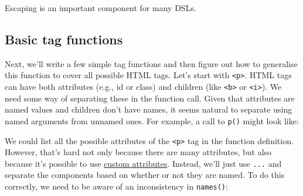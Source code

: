 Escaping is an important component for many DSLs.

\subsection{Basic tag functions}

Next, we'll write a few simple tag functions and then figure out how to
generalise this function to cover all possible HTML tags. Let's start
with \texttt{\textless{}p\textgreater{}}. HTML tags can have both
attributes (e.g., id or class) and children (like
\texttt{\textless{}b\textgreater{}} or
\texttt{\textless{}i\textgreater{}}). We need some way of separating
these in the function call. Given that attributes are named values and
children don't have names, it seems natural to separate using named
arguments from unnamed ones. For example, a call to \texttt{p()} might
look like:

\begin{Shaded}
\begin{Highlighting}[]
\NormalTok{(}\NormalTok{, }\NormalTok{(}\NormalTok{), } \NormalTok{)}
\end{Highlighting}
\end{Shaded}

We could list all the possible attributes of the
\texttt{\textless{}p\textgreater{}} tag in the function definition.
However, that's hard not only because there are many attributes, but
also because it's possible to use
\href{http://html5doctor.com/html5-custom-data-attributes/}{custom
attributes}. Instead, we'll just use \texttt{...} and separate the
components based on whether or not they are named. To do this correctly,
we need to be aware of an inconsistency in \texttt{names()}:

\begin{Shaded}
\begin{Highlighting}[]
\NormalTok{(}\NormalTok{(} \NormalTok{, } \NormalTok{))}
\NormalTok{(}\NormalTok{(} \NormalTok{, }\NormalTok{))}
\NormalTok{(}\NormalTok{(}\NormalTok{, }\NormalTok{))}
\end{Highlighting}
\end{Shaded}

